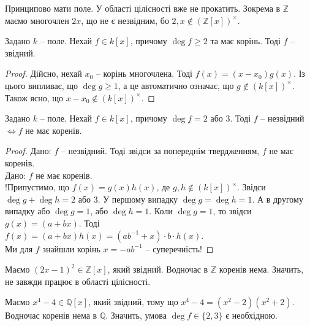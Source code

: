 \documentclass{math_library}
\begin{document}
\begin{remark}
Принципово мати поле. У області цілісності вже не прокатить. Зокрема в $\mathbb{Z}$ маємо многочлен $2x$, що не є незвідним, бо $2, x \notin (\mathbb{Z}[x])^\times$.
\end{remark}

\begin{proposition}
\label{degree_at_least_two_have_roots_then_reducible}
Задано $k$ -- поле. Нехай $f \in k[x]$, причому $\deg f \geq 2$ та має корінь. Тоді $f$ -- звідний.
\end{proposition}

\begin{proof}
Дійсно, нехай $x_0$ -- корінь многочлена. Тоді $f(x) = (x-x_0)g(x)$. Із цього випливає, що $\deg g \geq 1$, а це автоматично означає, що $g \notin (k[x])^\times$. Також ясно, що $x-x_0 \notin (k[x])^\times$.
\end{proof}

\begin{proposition}
\label{deg_two_or_three_polynomial_af_field_no_roots}
Задано $k$ -- поле. Нехай $f \in k[x]$, причому $\deg f = 2$ або $3$. Тоді $f$ -- незвідний $\iff f$ не має коренів.
\end{proposition}

\begin{proof}
\rightproof Дано: $f$ -- незвідний. Тоді звідси за попереднім твердженням, $f$ не має коренів.
\bigskip \\
\leftproof Дано: $f$ не має коренів.\\
!Припустимо, що $f(x) = g(x)h(x)$, де $g,h \notin (k[x])^\times$. Звідси $\deg g + \deg h = 2$ або $3$. У першому випадку $\deg g = \deg h = 1$. А в другому випадку або $\deg g = 1$, або $\deg h = 1$. Коли $\deg g = 1$, то звідси $g(x) = (a + bx)$. Тоді\\
$f(x) = (a + bx)h(x) = (ab^{-1}+x) \cdot b \cdot h(x)$.\\
Ми для $f$ знайшли корінь $x = -ab^{-1}$ -- суперечність!
\end{proof}

\begin{remark}
Маємо $(2x-1)^2 \in \mathbb{Z}[x]$, який звідний. Водночас в $\mathbb{Z}$ коренів нема. Значить, \leftproof не завжди працює в області цілісності.
\end{remark}

\begin{remark}
Маємо $x^4 - 4 \in \mathbb{Q}[x]$, який звідний, тому що $x^4 - 4 = (x^2 - 2)(x^2 +2)$. Водночас коренів нема в $\mathbb{Q}$. Значить, умова $\deg f \in \{2,3\}$ є необхідною.
\end{remark}
\end{document}
